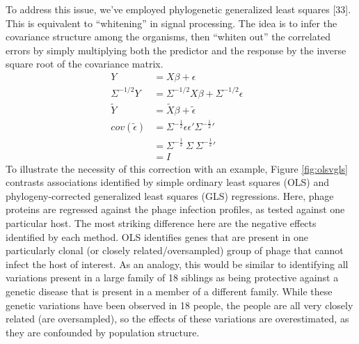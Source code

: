 \documentclass[12pt,twoside]{mitthesis-manusdown}
\begin{document}
To address this issue, we've employed phylogenetic generalized least
squares {[}33{]}. This is equivalent to ``whitening'' in signal
processing. The idea is to infer the covariance structure among the
organisms, then ``whiten out'' the correlated errors by simply
multiplying both the predictor and the response by the inverse square
root of the covariance matrix.
\begin{align*}
  Y &= X\beta + \epsilon\\
  \Sigma^{-1/2} Y &= \Sigma^{-1/2} X\beta + \Sigma^{-1/2} \epsilon &  \\
    \widetilde{Y} &= \widetilde{X}\beta + \widetilde{\epsilon} \\
  cov(\widetilde{\epsilon}) &= \Sigma^{-\frac{1}{2}} \epsilon \epsilon' \Sigma^{-\frac{1}{2}}{'} \\
    &= \Sigma^{-\frac{1}{2}} \  \Sigma \  \Sigma^{-\frac{1}{2}}{'} \\
    &= I
\end{align*}
To illustrate the necessity of this correction with an example, Figure
\ref{fig:olsvgls} contrasts associations identified by simple ordinary
least squares (OLS) and phylogeny-corrected generalized least squares
(GLS) regressions. Here, phage proteins are regressed against the phage
infection profiles, as tested against one particular host. The most
striking difference here are the negative effects identified by each
method. OLS identifies genes that are present in one particularly clonal
(or closely related/oversampled) group of phage that cannot infect the
host of interest. As an analogy, this would be similar to identifying
all variations present in a large family of 18 siblings as being
protective against a genetic disease that is present in a member of a
different family. While these genetic variations have been observed in
18 people, the people are all very closely related (are oversampled), so
the effects of these variations are overestimated, as they are
confounded by population structure.
\end{document}
